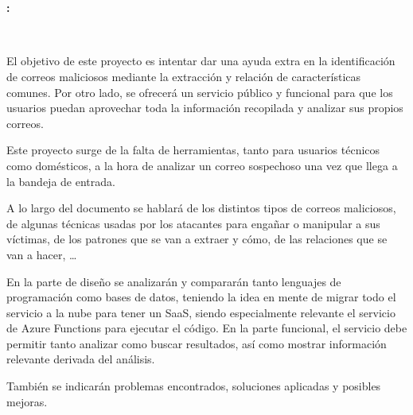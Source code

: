 \chapter*{}


%



\cleardoublepage
\thispagestyle{empty}

\begin{center}
{\large\bfseries \myTitle: \mySubTitle}\\
\end{center}
\begin{center}
\myName\\
\end{center}

\bigskip

\vspace{0.7cm}
\bigskip

El objetivo de este proyecto es intentar dar una ayuda extra en la identificación de correos maliciosos mediante la extracción y relación de características comunes. Por otro lado, se ofrecerá un servicio público y funcional para que los usuarios puedan aprovechar toda la información recopilada y analizar sus propios correos. 

Este proyecto surge de la falta de herramientas, tanto para usuarios técnicos como domésticos, a la hora de analizar un correo sospechoso una vez que llega a la bandeja de entrada. 

A lo largo del documento se hablará de los distintos tipos de correos maliciosos, de algunas técnicas usadas por los atacantes para engañar o manipular a sus víctimas, de los patrones que se van a extraer y cómo, de las relaciones que se van a hacer, …

En la parte de diseño se analizarán y compararán tanto lenguajes de programación como bases de datos, teniendo la idea en mente de migrar todo el servicio a la nube para tener un SaaS, siendo especialmente relevante el servicio de Azure Functions para ejecutar el código. 
En la parte funcional, el servicio debe permitir tanto analizar como buscar resultados, así como mostrar información relevante derivada del análisis.

También se indicarán problemas encontrados, soluciones aplicadas y posibles mejoras.

